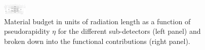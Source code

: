 \begin{figure}[h!]
 \centering
 \includegraphics[width=0.1\textwidth]{Images/cmsTracker_TrackerLayout}
\caption{Material budget in units of radiation length as a function of pseudorapidity $\eta$ for the different sub-detectors (left panel) and broken down into the functional contributions (right panel).}
\label{Material_Budget}
\end{figure}


